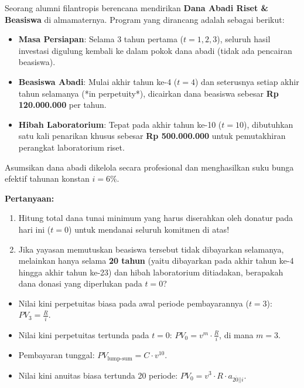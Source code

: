 \documentclass[11pt,a4paper]{article}
\newcommand{\angl}[1]{\overline{#1|}}
\begin{document}
\begin{soalbox}
Seorang alumni filantropis berencana mendirikan \textbf{Dana Abadi Riset \& Beasiswa} di almamaternya. Program yang dirancang adalah sebagai berikut:
\begin{itemize}[leftmargin=4mm, topsep=1pt, itemsep=1pt]
    \item \textbf{Masa Persiapan}: Selama 3 tahun pertama ($t=1, 2, 3$), seluruh hasil investasi digulung kembali ke dalam pokok dana abadi (tidak ada pencairan beasiswa).
    \item \textbf{Beasiswa Abadi}: Mulai akhir tahun ke-4 ($t=4$) dan seterusnya setiap akhir tahun selamanya (*in perpetuity*), dicairkan dana beasiswa sebesar \textbf{Rp 120.000.000} per tahun.
    \item \textbf{Hibah Laboratorium}: Tepat pada akhir tahun ke-10 ($t=10$), dibutuhkan satu kali penarikan khusus sebesar \textbf{Rp 500.000.000} untuk pemutakhiran perangkat laboratorium riset.
\end{itemize}
Asumsikan dana abadi dikelola secara profesional dan menghasilkan suku bunga efektif tahunan konstan $i = 6\%$.

\textbf{Pertanyaan:}
\begin{enumerate}[label=(\alph*), topsep=1pt, itemsep=1pt]
    \item Hitung total dana tunai minimum yang harus diserahkan oleh donatur pada hari ini ($t=0$) untuk mendanai seluruh komitmen di atas!
    \item Jika yayasan memutuskan beasiswa tersebut tidak dibayarkan selamanya, melainkan hanya selama \textbf{20 tahun} (yaitu dibayarkan pada akhir tahun ke-4 hingga akhir tahun ke-23) dan hibah laboratorium ditiadakan, berapakah dana donasi yang diperlukan pada $t=0$?
\end{enumerate}
\end{soalbox}

\begin{petunjukbox}
\begin{itemize}[leftmargin=4mm, topsep=1pt, itemsep=1pt]
    \item Nilai kini perpetuitas biasa pada awal periode pembayarannya ($t=3$): $PV_3 = \frac{R}{i}$.
    \item Nilai kini perpetuitas tertunda pada $t=0$: $PV_0 = v^m \cdot \frac{R}{i}$, di mana $m=3$.
    \item Pembayaran tunggal: $PV_{\text{lump-sum}} = C \cdot v^{10}$.
    \item Nilai kini anuitas biasa tertunda 20 periode: $PV_0 = v^3 \cdot R \cdot a_{\angl{20}|i}$.
\end{itemize}
\end{petunjukbox}
\end{document}
